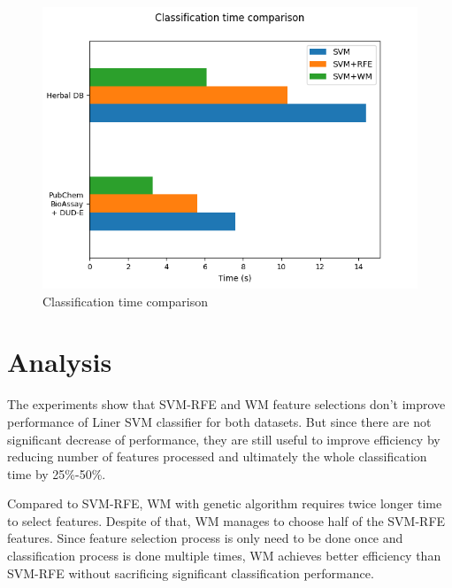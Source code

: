 \documentclass[conference,compsoc,12pt]{IEEEtran}
\begin{document}
	\begin{figure}
		\includegraphics[scale=0.5]{../images/classification_time_comparison.png}
		\caption{Classification time comparison}
		\label{fig_classification_time_comparison}
	\end{figure}
	
	\section{Analysis}

	The experiments show that SVM-RFE and WM feature selections don't improve performance of Liner SVM classifier for both datasets. But since there are not significant decrease of performance, they are still useful to improve efficiency by reducing number of features processed and ultimately the whole classification time by 25\%-50\%.
	
	Compared to SVM-RFE, WM with genetic algorithm requires twice longer time to select features. Despite of that, WM manages to choose half of the SVM-RFE features. Since feature selection process is only need to be done once and classification process is done multiple times, WM achieves better efficiency than SVM-RFE without sacrificing significant classification performance.
		
\end{document}
